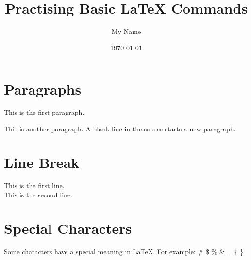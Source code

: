 \documentclass{article}
\title{Practising Basic LaTeX Commands}
\author{My Name}
\date{\today}
\begin{document}
\maketitle

\section{Paragraphs}
This is the first paragraph.

This is another paragraph. A blank line in the source starts a new paragraph.

\section{Line Break}
This is the first line.\\
This is the second line.

\section{Special Characters}
Some characters have a special meaning in LaTeX. For example:
\# \$ \% \& \_ \{ \}
\end{document}
